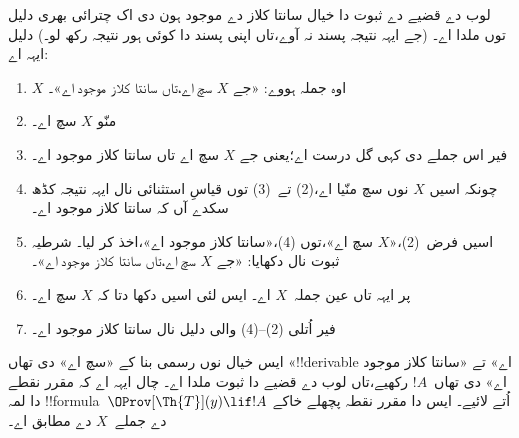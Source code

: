 \documentclass[../../../include/open-logic-section]{subfiles}
\begin{document}
\begin{explain}
لوب دے قضیے دے ثبوت دا خیال سانتا کلاز دے موجود ہون دی
اک چترائی بھری دلیل توں ملدا اے۔ (جے ایہہ نتیجہ پسند نہ
آوے،تاں اپنی پسند دا کوئی ہور نتیجہ رکھ لو۔) دلیل ایہہ اے:
\begin{enumerate}
\item $X$ اوہ جملہ ہووے: «جے $X$ سچ اے،تاں سانتا کلاز
  موجود اے»۔
\item منّو $X$ سچ اے۔
\item فیر اس جملے دی کہی گل درست اے؛یعنی جے $X$ سچ اے
  تاں سانتا کلاز موجود اے۔
\item چونکہ اسیں $X$ نوں سچ منّیا اے،(2) تے~(3) توں
  قیاسِ استثنائی نال ایہہ نتیجہ کڈھ سکدے آں کہ سانتا کلاز
  موجود اے۔
\item اسیں فرض~(2)،«$X$ سچ اے»،توں (4)،«سانتا کلاز
  موجود اے»،اخذ کر لیا۔ شرطیہ ثبوت نال دکھایا: «جے $X$
  سچ اے،تاں سانتا کلاز موجود اے»۔
\item پر ایہہ تاں عین جملہ~$X$ اے۔ ایس لئی اسیں دکھا
  دتا کہ $X$ سچ اے۔
\item فیر اُتلی (2)--(4) والی دلیل نال سانتا کلاز موجود اے۔
\end{enumerate}
ایس خیال نوں رسمی بنا کے «سچ اے» دی تھاں «!!{derivable}
اے» تے «سانتا کلاز موجود اے» دی تھاں~$!A$ رکھیے،تاں
لوب دے قضیے دا ثبوت ملدا اے۔ چال ایہہ اے کہ مقرر نقطے دا
لمہ !!{formula}~$\OProv[\Th{T}](y) \lif !A$ اُتے
لائیے۔ ایس دا مقرر نقطہ پچھلے خاکے دے جملے~$X$ دے
مطابق اے۔
\end{explain}
\end{document}

